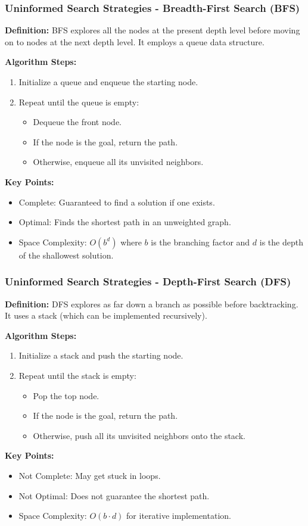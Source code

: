 \documentclass[aspectratio=169]{beamer}
\begin{document}
\begin{frame}[fragile]
  \frametitle{Uninformed Search Strategies - Breadth-First Search (BFS)}
  \textbf{Definition:} 
  BFS explores all the nodes at the present depth level before moving on to nodes at the next depth level. It employs a queue data structure.

  \textbf{Algorithm Steps:}
  \begin{enumerate}
    \item Initialize a queue and enqueue the starting node.
    \item Repeat until the queue is empty:
      \begin{itemize}
        \item Dequeue the front node.
        \item If the node is the goal, return the path.
        \item Otherwise, enqueue all its unvisited neighbors.
      \end{itemize}
  \end{enumerate}

  \textbf{Key Points:}
  \begin{itemize}
    \item Complete: Guaranteed to find a solution if one exists.
    \item Optimal: Finds the shortest path in an unweighted graph.
    \item Space Complexity: $O(b^d)$ where $b$ is the branching factor and $d$ is the depth of the shallowest solution.
  \end{itemize}
\end{frame}

\begin{frame}[fragile]
  \frametitle{Uninformed Search Strategies - Depth-First Search (DFS)}
  \textbf{Definition:} 
  DFS explores as far down a branch as possible before backtracking. It uses a stack (which can be implemented recursively).

  \textbf{Algorithm Steps:}
  \begin{enumerate}
    \item Initialize a stack and push the starting node.
    \item Repeat until the stack is empty:
      \begin{itemize}
        \item Pop the top node.
        \item If the node is the goal, return the path.
        \item Otherwise, push all its unvisited neighbors onto the stack.
      \end{itemize}
  \end{enumerate}

  \textbf{Key Points:}
  \begin{itemize}
    \item Not Complete: May get stuck in loops.
    \item Not Optimal: Does not guarantee the shortest path.
    \item Space Complexity: $O(b \cdot d)$ for iterative implementation.
  \end{itemize}
\end{frame}
\end{document}
